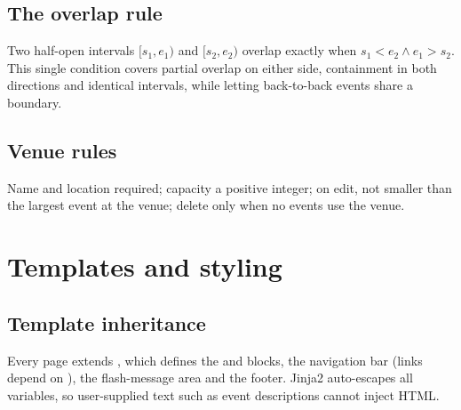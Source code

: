\documentclass[11pt,a4paper]{article}
\begin{document}
\subsection{The overlap rule}

Two half-open intervals $[s_1, e_1)$ and $[s_2, e_2)$ overlap exactly when
$s_1 < e_2 \land e_1 > s_2$. This single condition covers partial overlap on either side,
containment in both directions and identical intervals, while letting back-to-back events share a
boundary.

\subsection{Venue rules}

Name and location required; capacity a positive integer; on edit, not smaller than the largest event
at the venue; delete only when no events use the venue.

\section{Templates and styling}

\subsection{Template inheritance}

Every page extends , which defines the  and 
blocks, the navigation bar (links depend on ), the flash-message area and the
footer. Jinja2 auto-escapes all variables, so user-supplied text such as event descriptions cannot
inject HTML.
\end{document}
